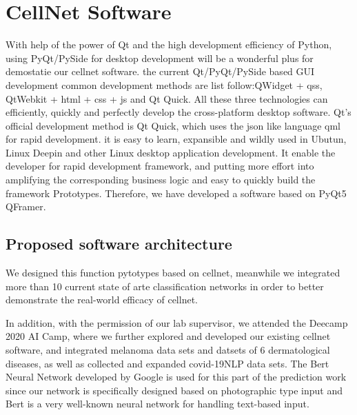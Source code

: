 \section{CellNet Software}
\label{sec:ipsum}
With help of the power of Qt and the high development efficiency of Python, using PyQt/PySide for desktop development will be a wonderful plus for  demostatie our cellnet software.
the current Qt/PyQt/PySide based GUI development common development methods are list follow:QWidget + qss, QtWebkit + html + css + js and Qt Quick. All these three technologies can efficiently, quickly and perfectly develop the cross-platform desktop software. Qt's official development method is Qt Quick, which uses the json like language qml for rapid development. it is easy to learn, expansible and wildly used in  Ubutun, Linux Deepin and other Linux desktop application development. It enable the developer for rapid development framework, and putting more effort into amplifying the corresponding business logic and easy to quickly build the framework Prototypes. Therefore, we have developed a  software based on PyQt5 QFramer.

\subsection{Proposed software architecture} %
\label{sub:dolor_sit}
We designed this function pytotypes based on cellnet, meanwhile we integrated more than 10 current state of arte classification networks in order to better demonstrate the real-world efficacy of cellnet.

In addition, with the permission of our lab supervisor, we attended the Deecamp 2020 AI Camp, where we further explored and developed our existing cellnet software, and integrated melanoma data sets and datsets of 6 dermatological diseases, as well as collected and expanded covid-19NLP data sets. The Bert Neural Network developed by Google is used for this part of the prediction work since our network is specifically designed based on photographic type input and Bert is a very well-known neural network for handling text-based input.

